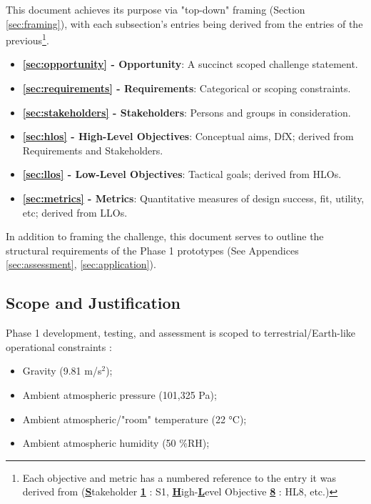 \documentclass{report}
\begin{document}
This document achieves its purpose via "top-down" framing (Section \ref{sec:framing}), with each subsection's 
entries being derived from the entries of the previous\footnote{Each objective and metric has 
a numbered reference to the entry it was derived from (\uline{\textbf{S}}takeholder 
\uline{\textbf{1}} : S1, \uline{\textbf{H}}igh-\uline{\textbf{L}}evel Objective 
\uline{\textbf{8}} : HL8, etc.)}.

\begin{itemize}
    \item \textbf{\ref{sec:opportunity} - Opportunity}: A succinct scoped challenge 
    statement.
    \item \textbf{\ref{sec:requirements} - Requirements}: Categorical or scoping constraints.
    \item \textbf{\ref{sec:stakeholders} - Stakeholders}: Persons and groups in 
    consideration.
    \item \textbf{\ref{sec:hlos} - High-Level Objectives}: Conceptual aims, DfX; derived 
    from Requirements and Stakeholders.
    \item \textbf{\ref{sec:llos} - Low-Level Objectives}: Tactical goals; derived from HLOs.
    \item \textbf{\ref{sec:metrics} - Metrics}: Quantitative measures of design success, fit, 
    utility, etc; derived from LLOs.
\end{itemize}

In addition to framing the challenge, this document serves to outline the structural requirements 
of the Phase 1 prototypes (See Appendices \ref{sec:assessment}, \ref{sec:application}).

\newpage

\subsection{Scope and Justification}
\label{sec:scope}

Phase 1 development, testing, and assessment is scoped to terrestrial/Earth-like operational constraints \cite{applicantguide}:
\begin{itemize}
    \item Gravity (9.81 m/s${}^2$);
    \item Ambient atmospheric pressure (101,325 Pa);
    \item Ambient atmospheric/"room" temperature (22 °C);
    \item Ambient atmospheric humidity (50 \%RH);
\end{itemize}
\end{document}
